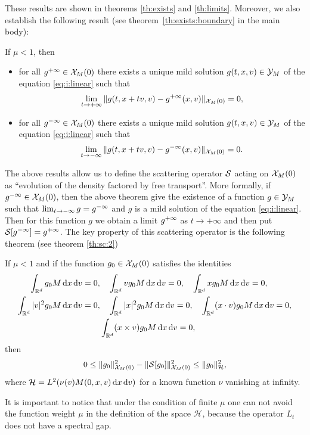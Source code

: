 These results are shown in theorems \ref{th:exists} and \ref{th:limits}. Moreover, we also establish the following result (see theorem~\ref{th:exists:boundary} in the main body):

\begin{theorem*}
	If $\mu<1$, then 

	\begin{itemize}
	\item 
		for all ${g^{+\infty}}\in{\mathcal X_M(0)}$ there exists a unique mild solution $g(t,x,v)\in {\mathcal Y_M}$ of the equation \eqref{eq:i:linear} such that \[\lim_{t\to+ \infty} \|g(t,x+tv,v)-{g^{+\infty}}(x,v)\|_{{\mathcal X_M(0)}} =0, \]
		\item 
		for all ${g^{-\infty}}\in{\mathcal X_M(0)}$ there exists a unique mild solution $g(t,x,v)\in {\mathcal Y_M}$ of the equation \eqref{eq:i:linear} such that \[\lim_{t\to- \infty} \|g(t,x+tv,v)-{g^{-\infty}}(x,v)\|_{{\mathcal X_M(0)}} =0. \]
	\end{itemize}
\end{theorem*}
The above results allow us to define the scattering operator $\mathcal S$ acting on ${\mathcal X_M(0)}$ as \enquote{evolution of the density factored by free transport}. More formally, if ${g^{-\infty}} \in {\mathcal X_M(0)}$, then the above theorem give the existence of a function $g\in {\mathcal Y_M}$ such that $\lim_{t\to - \infty}g={g^{-\infty}}$ and $g$ is a mild solution of the equation \eqref{eq:i:linear}. Then for this function $g$ we obtain a limit ${g^{+\infty}}$ as $t\to +\infty$ and then put $\mathcal S [{g^{-\infty}}]={g^{+\infty}}$. The key property of this scattering operator is the following theorem (see theorem \ref{th:sc:2})



\begin{theorem*} If $\mu<1$ and if the function $g_{0}\in {\mathcal X_M(0)}$ satisfies the identities
\[\begin{aligned}
	\int_{{\mathbb R^d}} g_0 M{\,\mathrm{d} x}{\,\mathrm{d} v} =0,&\quad\int_{{\mathbb R^d}}v g_0 M{\,\mathrm{d} x}{\,\mathrm{d} v} =0,\quad\int_{{\mathbb R^d}} xg_0 M{\,\mathrm{d} x}{\,\mathrm{d} v} =0,\\
	\int_{{\mathbb R^d}} |v|^2g_0 M{\,\mathrm{d} x}{\,\mathrm{d} v} =0,&\quad\int_{{\mathbb R^d}} |x|^2g_0 M{\,\mathrm{d} x}{\,\mathrm{d} v} =0,\quad\int_{{\mathbb R^d}} (x\cdot v)g_0 M{\,\mathrm{d} x}{\,\mathrm{d} v} =0,\\
&\int_{{\mathbb R^d}} (x\times v)g_0 M{\,\mathrm{d} x}{\,\mathrm{d} v}=0,
\end{aligned}\]
then
\[0\le \|g_0\|^2_{{\mathcal X_M(0)}}-\|\mathcal S[g_0]\|^2_{{\mathcal X_M(0)}}\le \|g_0\|^2_{\mathcal H},\]
where $\mathcal H = L^2(\nu(v)M(0,x,v){\,\mathrm{d} x}{\,\mathrm{d} v}) $ for a known function $\nu$ vanishing at infinity.
\end{theorem*}
It is important to notice that under the condition of finite $\mu$ one can not avoid the function weight $\mu$ in the definition of the space $\mathcal H$, because the operator $L_t$ does not have a spectral gap.


